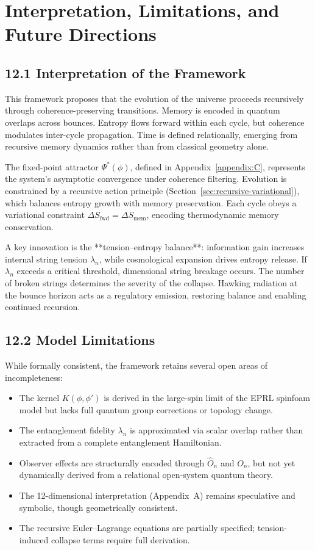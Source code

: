 \section{Interpretation, Limitations, and Future Directions}
\label{sec:interpretation}

\subsection{12.1 Interpretation of the Framework}

This framework proposes that the evolution of the universe proceeds recursively through coherence-preserving transitions. Memory is encoded in quantum overlaps across bounces. Entropy flows forward within each cycle, but coherence modulates inter-cycle propagation. Time is defined relationally, emerging from recursive memory dynamics rather than from classical geometry alone.

The fixed-point attractor \( \Psi^*(\phi) \), defined in Appendix~\ref{appendix:C}, represents the system’s asymptotic convergence under coherence filtering. Evolution is constrained by a recursive action principle (Section~\ref{sec:recursive-variational}), which balances entropy growth with memory preservation. Each cycle obeys a variational constraint \( \Delta S_{\text{fwd}} = \Delta S_{\text{mem}} \), encoding thermodynamic memory conservation.

A key innovation is the **tension–entropy balance**: information gain increases internal string tension \( \lambda_n \), while cosmological expansion drives entropy release. If \( \lambda_n \) exceeds a critical threshold, dimensional string breakage occurs. The number of broken strings determines the severity of the collapse. Hawking radiation at the bounce horizon acts as a regulatory emission, restoring balance and enabling continued recursion.

\subsection{12.2 Model Limitations}

While formally consistent, the framework retains several open areas of incompleteness:

\begin{itemize}
  \item The kernel \( K(\phi, \phi') \) is derived in the large-spin limit of the EPRL spinfoam model but lacks full quantum group corrections or topology change.
  \item The entanglement fidelity \( \lambda_n \) is approximated via scalar overlap rather than extracted from a complete entanglement Hamiltonian.
  \item Observer effects are structurally encoded through \( \hat{O}_n \) and \( O_n \), but not yet dynamically derived from a relational open-system quantum theory.
  \item The 12-dimensional interpretation (Appendix~A) remains speculative and symbolic, though geometrically consistent.
  \item The recursive Euler–Lagrange equations are partially specified; tension-induced collapse terms require full derivation.
\end{itemize}

